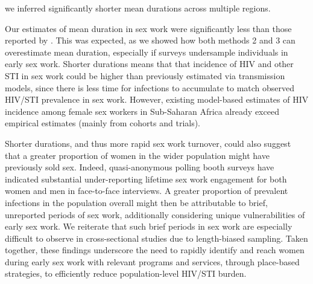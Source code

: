 we inferred significantly shorter mean durations across multiple regions.
\par %
Our estimates of mean duration in sex work were
significantly less than those reported by \citet{Fazito2012}.
This was expected, as we showed how both methods 2 and 3 can overestimate mean duration,
especially if surveys undersample individuals in early sex work.
Shorter durations means that that incidence of HIV and other STI in sex work
could be higher than previously estimated via transmission models,
since there is less time for infections to accumulate
to match observed HIV/STI prevalence in sex work.\cite{Knight2020,Anderegg2024}
However, existing model-based estimates of HIV incidence
among female sex workers in Sub-Saharan Africa
already exceed empirical estimates (mainly from cohorts and trials).
\cite{Jones2024,Stevens2024inc}
\par %
Shorter durations, and thus more rapid sex work turnover, could also suggest that
a greater proportion of women in the wider population might have previously sold sex.
Indeed, quasi-anonymous polling booth surveys have indicated
substantial under-reporting lifetime sex work engagement for both women and men
in face-to-face interviews.\cite{Lowndes2012,Behanzin2013}
A greater proportion of prevalent infections in the population overall
might then be attributable to brief, unreported periods of sex work,
additionally considering unique vulnerabilities of early sex work.\cite{Cheuk2020}
We reiterate that such brief periods in sex work are
especially difficult to observe in cross-sectional studies
due to length-biased sampling.\cite{Ross2003}
Taken together, these findings underscore
the need to rapidly identify and reach women during early sex work
with relevant programs and services, \eg through place-based strategies,
to efficiently reduce population-level HIV/STI burden.
\cite{Cheuk2020,Neufeld2023,Bhattacharjee2023,McClarty2026}
\par %
